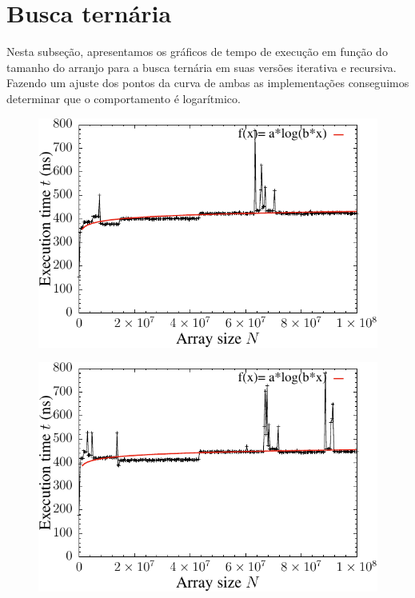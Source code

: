 \section{Busca ternária}

Nesta subseção, apresentamos os gráficos de tempo de execução em função do tamanho do arranjo para a busca ternária em suas versões iterativa e recursiva. Fazendo um ajuste dos pontos da curva de ambas as implementações conseguimos determinar que o comportamento é logarítmico.
\begin{figure}[H]
  \centering
  \includegraphics[scale=1.2]{../plots/tsearch_it_time.pdf}
\end{figure} \label{fig:tseach_it_time}

\begin{figure}[H]
  \centering
  \includegraphics[scale=1.2]{../plots/tsearch_rec_time.pdf}
\end{figure} \label{fig:tseach_rec_time}

